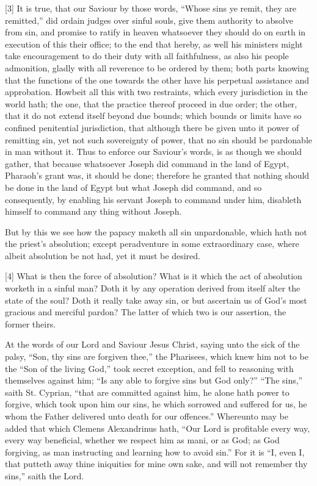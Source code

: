 [3] It is true, that our Saviour by those words, “Whose sins ye remit, they are remitted,” did ordain judges over sinful souls, give them authority to absolve from sin, and promise to ratify in heaven whatsoever they should do on earth in execution of this their office; to the end that hereby, as well his ministers might take encouragement to do their duty with all faithfulness, as also his people admonition, gladly with all reverence to be ordered by them; both parts knowing that the functions of the one towards the other have his perpetual assistance and approbation. Howbeit all this with two restraints, which every jurisdiction in the world hath; the one, that the practice thereof proceed in due order; the other, that it do not extend itself beyond due bounds; which bounds or limits have so confined penitential jurisdiction, that although there be given unto it power of remitting sin, yet not such sovereignty of power, that no sin should be pardonable in man without it. Thus to enforce our Saviour’s words, is as though we should gather, that because whatsoever Joseph did command in the land of Egypt, Pharaoh’s grant was, it should be done; therefore he granted that nothing should be done in the land of Egypt but what Joseph did command, and so consequently, by enabling his servant Joseph to command under him, disableth himself to command any thing without Joseph.

But by this we see how the papacy maketh all sin unpardonable, which hath not the priest’s absolution; except peradventure in some extraordinary case, where albeit absolution be not had, yet it must be desired.


[4] What is then the force of absolution? What is it which the act of absolution worketh in a sinful man? Doth it by any operation derived from itself alter the state of the soul? Doth it really take away sin, or but ascertain us of God’s most gracious and merciful pardon? The latter of which two is our assertion, the former theirs.

At the words of our Lord and Saviour Jesus Christ, saying unto the sick of the palsy, “Son, thy sins are forgiven thee,” the Pharisees, which knew him not to be the “Son of the living God,” took secret exception, and fell to reasoning with themselves against him; “Is any able to forgive sins but God only?” “The sins,” saith St. Cyprian, “that are committed against him, he alone hath power to forgive, which took upon him our sins, he which sorrowed and suffered for us, he whom the Father delivered unto death for our offences.” Whereunto may be added that which Clemens Alexandrinus hath, “Our Lord is profitable every way, every way beneficial, whether we respect him as mani, or as God; as God forgiving, as man instructing and learning how to avoid sin.” For it is “I, even I, that putteth away thine iniquities for mine own sake, and will not remember thy sins,” saith the Lord.

